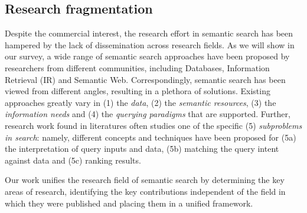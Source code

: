 \subsection{Research fragmentation}

Despite the commercial interest, the research effort in semantic search has been hampered by the lack of dissemination across research fields. As we will show in our survey, a wide range of semantic search approaches have been proposed by researchers from different communities, including Databases, Information Retrieval (IR) and Semantic Web. Correspondingly, semantic search has been viewed from different angles, resulting in a plethora of solutions. Existing approaches greatly vary in (1) the \emph{data}, (2) the \emph{semantic resources}, (3) the \emph{information needs} and (4) the \emph{querying paradigms} that are supported. Further, research work found in literatures often studies one of the specific (5) \emph{subproblems in search}: namely, different concepts and techniques have been proposed for (5a) the interpretation of query inputs and data, (5b) matching the query intent against data and (5c) ranking results.  



Our work unifies the research field of semantic search by determining the key areas of research, identifying the key contributions independent of the field in which they were published and placing them in a unified framework. 

